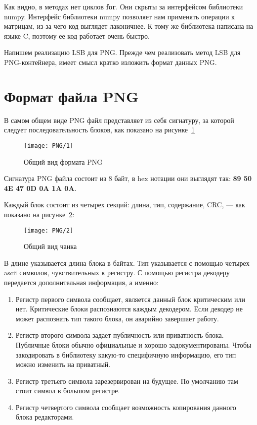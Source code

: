 Как видно, в методах нет циклов \textbf{for}. Они скрыты за интерфейсом библиотеки numpy.
Интерфейс библиотеки numpy позволяет нам применять операции к матрицам,
из-за чего код выглядет лаконичнее. К тому же библиотека написана на языке C,
поэтому ее код работает очень быстро.

Напишем реализацию LSB для PNG. Прежде чем реализовать метод LSB для PNG-контейнера,
имеет смысл кратко изложить формат данных PNG.

\section{Формат файла PNG}

В самом общем виде PNG файл представляет из себя сигнатуру,
за которой следует последовательность блоков,
как показано на рисунке~\ref{img:png_1}
\begin{figure}[ht!]
    \caption{Общий вид формата PNG}
    \texttt{[image: PNG/1]}
    \centering
    \label{img:png_1}
\end{figure}

Сигнатура PNG файла состоит из 8 байт, в hex нотации они выглядят так:
\textbf{89 50 4E 47 0D 0A 1A 0A}.

Каждый блок состоит из четырех секций: длина, тип, содержание, CRC, --- как показано на рисунке~\ref{img:png_2}:
\begin{figure}[ht!]
    \caption{Общий вид чанка}
    \texttt{[image: PNG/2]}
    \centering
    \label{img:png_2}
\end{figure}
В длине указывается длина блока в байтах. Тип указывается с помощью четырех ascii символов,
чувствительных к регистру. С помощью регистра декодеру передается дополнительная информация, а именно:
\begin{enumerate}
    \item Регистр первого символа сообщает, является данный блок критическим или нет. Критические
    блоки распознаются каждым декодером. Если декодер не может распознать тип такого блока,
    он аварийно завершает работу.
    \item Регистр второго символа задает публичность или приватность блока.
    Публичные блоки обычно официальные и хорошо задокументированы. Чтобы закодировать в библиотеку
    какую-то специфичную информацию, его тип можно изменить на приватный.
    \item Регистр третьего символа зарезервирован на будущее. По умолчанию там стоит символ в большом регистре.
    \item Регистр четвертого символа сообщает возможность копирования данного блока редакторами.
\end{enumerate}

